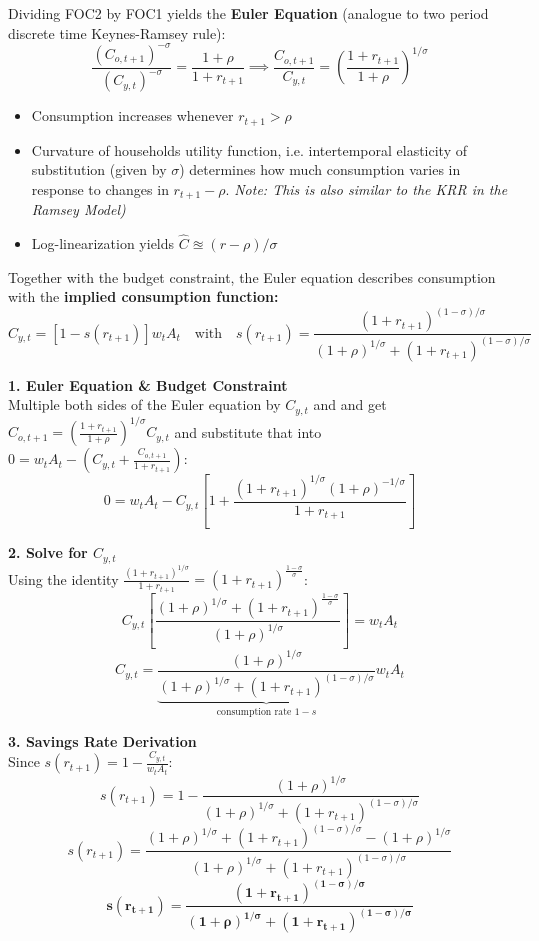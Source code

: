Dividing FOC2 by FOC1 yields the \textbf{Euler Equation} (analogue to two period discrete time Keynes-Ramsey rule): 
$$\frac{(C_{o,t+1})^{-\sigma}}{(C_{y,t})^{-\sigma}} = \frac{1+\rho}{1+r_{t+1}} \implies \frac{C_{o,t+1}}{C_{y,t}} = \left( \frac{1+r_{t+1}}{1+\rho} \right)^{1/\sigma}$$
\begin{itemize}
    \item Consumption increases whenever $r_{t+1}>\rho$
    \item Curvature of households utility function, i.e. intertemporal elasticity of substitution (given by $\sigma$) determines how much consumption varies in response to changes in $r_{t+1}-\rho$.   \textit{Note: This is also similar to the KRR in the Ramsey Model)}
    \item Log-linearization yields $\hat{C}\approxeq(r-\rho)/\sigma$
\end{itemize}
Together with the budget constraint, the Euler equation describes consumption with the \textbf{implied consumption function:}
$$C_{y,t} = [1 - s(r_{t+1})] w_t A_t \quad \text{with} \quad s(r_{t+1}) = \frac{(1+r_{t+1})^{(1-\sigma)/\sigma}}{(1+\rho)^{1/\sigma} + (1+r_{t+1})^{(1-\sigma)/\sigma}}$$



\begin{tcolorbox}[
    colback=red!5!white, 
    colframe=red!40!white, 
    title=Derivation of the savings rate and consumption, 
    fonttitle=\bfseries 
    ]
    \small
    \textbf{1. Euler Equation \& Budget Constraint} \\
    Multiple both sides of the Euler equation by $C_{y,t}$ and and get $C_{o,t+1} = \left( \frac{1+r_{t+1}}{1+\rho} \right)^{1/\sigma} C_{y,t}$ and substitute that into\\ $0 = w_t A_t - \left( C_{y,t} + \frac{C_{o,t+1}}{1+r_{t+1}} \right)$:
    \[
    0 = w_t A_t - C_{y,t} \left[ 1 + \frac{(1+r_{t+1})^{1/\sigma} (1+\rho)^{-1/\sigma}}{1+r_{t+1}} \right]
    \]

    \textbf{2. Solve for $C_{y,t}$} \\
    Using the identity $\frac{(1+r_{t+1})^{1/\sigma}}{1+r_{t+1}} = (1+r_{t+1})^{\frac{1-\sigma}{\sigma}}$:
    \[
    C_{y,t} \left[ \frac{(1+\rho)^{1/\sigma} + (1+r_{t+1})^{\frac{1-\sigma}{\sigma}}}{(1+\rho)^{1/\sigma}} \right] = w_t A_t
    \]
    \[
    C_{y,t} = \underbrace{\frac{(1+\rho)^{1/\sigma}}{(1+\rho)^{1/\sigma} + (1+r_{t+1})^{(1-\sigma)/\sigma}}}_{\text{consumption rate } 1-s} w_t A_t
    \]

    \textbf{3. Savings Rate Derivation} \\
    Since $s(r_{t+1}) = 1 - \frac{C_{y,t}}{w_t A_t}$:
    \[
    s(r_{t+1}) = 1 - \frac{(1+\rho)^{1/\sigma}}{(1+\rho)^{1/\sigma} + (1+r_{t+1})^{(1-\sigma)/\sigma}}
    \]
    \[
    s(r_{t+1}) = \frac{(1+\rho)^{1/\sigma} + (1+r_{t+1})^{(1-\sigma)/\sigma} - (1+\rho)^{1/\sigma}}{(1+\rho)^{1/\sigma} + (1+r_{t+1})^{(1-\sigma)/\sigma}}
    \]
    \[
    \mathbf{s(r_{t+1}) = \frac{(1+r_{t+1})^{(1-\sigma)/\sigma}}{(1+\rho)^{1/\sigma} + (1+r_{t+1})^{(1-\sigma)/\sigma}}}
    \]
\end{tcolorbox}

